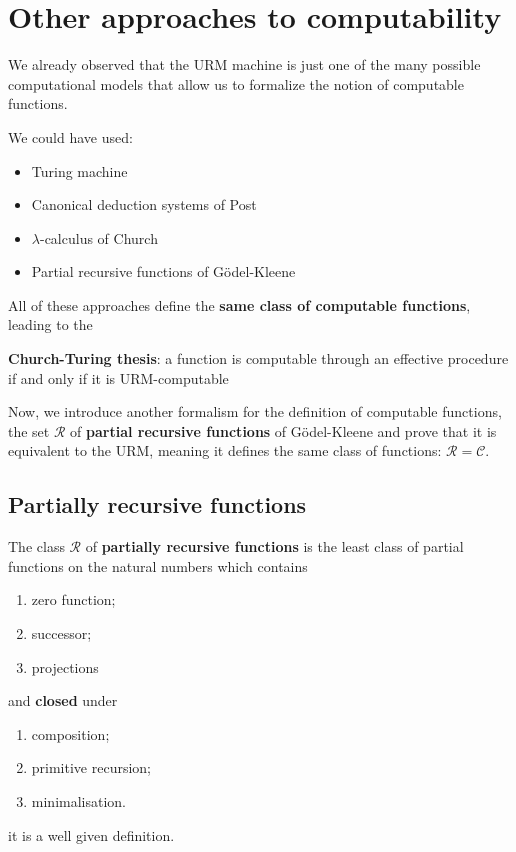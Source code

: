 \chapter{Other approaches to computability}
We already observed that the URM machine is just one of the many possible computational models that allow us to formalize the notion of computable functions.

We could have used:
\begin{itemize}
\item Turing machine
\item Canonical deduction systems of Post
\item $\lambda$-calculus of Church
\item Partial recursive functions of Gödel-Kleene
\end{itemize}

All of these approaches define the \textbf{same class of computable functions}, leading to the

\textbf{Church-Turing thesis}: a function is computable through an effective procedure 
if and only if it is URM-computable

Now, we introduce another formalism for the definition of computable functions, the set $\mathcal{R}$ of \textbf{partial recursive functions} of Gödel-Kleene and prove that it is equivalent to the URM, meaning it defines the same class of functions: $\mathcal{R} = \mathcal{C}$.

\section{Partially recursive functions}

\begin{definition}
  The class $ \mathcal{R} $ of \textbf{partially recursive functions} is the least class of partial functions on the natural numbers which contains
  \begin{enumerate}[label=(\alph*)]
    \item zero function;
    \item successor;
    \item projections
    \end{enumerate}
    
    and \textbf{closed} under
    \begin{enumerate}
    \item composition;
    \item primitive recursion;
    \item minimalisation.
    \end{enumerate}
\end{definition}
it is a well given definition.

